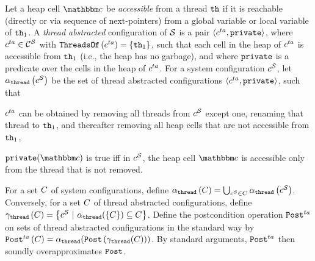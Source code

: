 Let a heap cell $\cell$ be {\em accessible} from a thread ${\tt th}$ if
it is reachable (directly or via sequence of
next-pointers) from a global variable or local variable of ${\tt th}_1$.
A {\it thread abstracted} configuration of ${\mathcal S}$
is  a pair $\left\langle c^{ta},{\tt private}\right\rangle$, where
$c^{ta} \in {\mathcal C}^{{\mathcal S}}$ with
${\tt ThreadsOf}\left(c^{ta}\right) = \left\{{\tt th}_1\right\}$, such that
each cell in the heap of $c^{ta}$ is accessible from ${\tt th}_1$
(i.e., the heap has no garbage), and where ${\tt private}$ is a predicate over the
cells in the heap of $c^{ta}$.
For a system configuration $c^{\mathcal S}$,
let $\alpha_{\tt thread}\left(c^{\mathcal S}\right)$ be the set of 
thread abstracted configurations $\left\langle c^{ta},{\tt private}\right\rangle$, such that
\begin{inparaenum}[(i)]
\item
  $c^{ta}$ can be obtained by
  removing all threads from $c^{\mathcal S}$ except one,
  renaming that thread
  to ${\tt th}_1$, and thereafter removing all heap cells that are not
  accessible from ${\tt th}_1$,
\item
  $\private(\cell)$ is true iff in $c^{\mathcal S}$, the heap cell
  $\cell$ is accessible only from
  the thread that is not removed.
\end{inparaenum}
For  a set $C$ of system configurations, define
$\alpha_{\tt thread}\left(C\right) = \mathop\bigcup_{c^{\mathcal S} \in C}\alpha_{\tt thread}\left(c^{\mathcal S}\right)$.
Conversely, for a set $C$ of thread abstracted configurations,
define
$\gamma_{\tt thread}\left(C\right)=
\left\{c^{\mathcal S}\ | \ \alpha_{\tt thread}(\{C\})\subseteq C\right\}$.
%
Define the postcondition operation ${\tt Post}^{ta}$ on sets of
thread abstracted configurations in the standard way by
\(
{\tt Post}^{ta}\left(C\right) =
\alpha_{\tt thread}({\tt Post}\left(\gamma_{\tt thread}(C)\right))
\).
By standard arguments, ${\tt Post}^{ta}$ then soundly overapproximates
${\tt Post}$.


